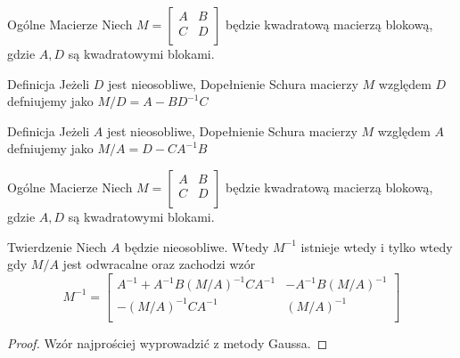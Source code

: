 \documentclass{beamer}
\begin{document}
\begin{frame}{Ogólne Macierze}
    Niech $M = \begin{bmatrix}
        A & B \\ C & D \\ 
    \end{bmatrix}$ będzie kwadratową macierzą blokową, gdzie $A,D$ są kwadratowymi blokami. 
    \begin{block}{Definicja}
        Jeżeli $D$ jest nieosobliwe, \alert{Dopełnienie Schura} macierzy $M$ względem $D$ defniujemy jako 
        $M/D = A -BD^{-1}C$
    \end{block}
    \begin{block}{Definicja}
        Jeżeli $A$ jest nieosobliwe, \alert{Dopełnienie Schura} macierzy $M$ względem $A$ defniujemy jako 
        $M/A = D -CA^{-1}B$
    \end{block}
\end{frame}

\begin{frame}{Ogólne Macierze}
    Niech $M = \begin{bmatrix}
        A & B \\ C & D \\ 
    \end{bmatrix}$ będzie kwadratową macierzą blokową, gdzie $A,D$ są kwadratowymi blokami.
    \begin{block}{Twierdzenie}
        Niech $A$ będzie nieosobliwe. Wtedy $M^{-1}$ istnieje wtedy i tylko wtedy gdy $M/A$ jest odwracalne 
        oraz zachodzi wzór
        $$ M^{-1}  = \begin{bmatrix}
            A^{-1} + A^{-1} B (M/A)^{-1} C A^{-1} & - A^{-1} B (M/A)^{-1} \\
            -(M/A)^{-1} C A^{-1} & (M/A)^{-1} \\  
        \end{bmatrix}$$
    \end{block}
    \begin{proof}
        Wzór najprościej wyprowadzić z metody Gaussa. 
    \end{proof}
\end{frame}
\end{document}
